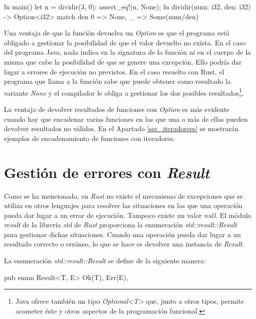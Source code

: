 \vspace{0.7em}
\begin{Codigo}
   fn main() {
      let n = dividir(3, 0);
      assert_eq!(n, None);
   }
   fn dividir(num: i32, den: i32) -> Option<i32> {
      match den {
         0 => None,
         _ => Some(num/den)
      }
   }
\end{Codigo}

Una ventaja de que la función devuelva un \textit{Option} es que el programa está obligado a gestionar la posibilidad de que el valor devuelto no exista. En el caso del programa Java, nada indica en la signatura de la función ni en el cuerpo de la misma que cabe la posibilidad de que se genere una excepción. Ello podría dar lugar a errores de ejecución no previstos. En el caso resuelto con Rust, el programa que llama a la función sabe que puede obtener como resultado la variante \textit{None} y el compilador le obliga a gestionar los dos posibles resultados\footnote{Java ofrece también un tipo \textit{Optional<T>} que, junto a otros tipos, permite acometer éste y otros aspectos de la programación funcional.}.

La ventaja de devolver resultados de funciones con \textit{Option} es más evidente cuando hay que encadenar varias funciones en las que una o más de ellas pueden devolver resultados no válidos. En el Apartado \ref{sec_iteradorees} se mostrarán ejemplos de encadenamiento de funciones con iteradores.

\section{Gestión de errores con \textit{Result}}
\noindent Como se ha mencionado, en \textit{Rust} no existe el mecanismo de excepciones que se utiliza en otros lenguajes para resolver las situaciones en las que una operación pueda dar lugar a un error de ejecución. Tampoco existe un valor \textit{null}. El módulo \textit{result} de la librería \textit{std} de \textit{Rust} proporciona la enumeración \textit{std::result::Result} para gestionar dichas situaciones. Cuando una operación pueda dar lugar a un resultado correcto o erróneo, lo que se hace es devolver una instancia de \textit{Result}.

La enumeración \textit{std::result::Result} se define de la siguiente manera:

\begin{Codigo}
   pub enum Result<T, E> {
      Ok(T),
      Err(E),
   }
\end{Codigo}

